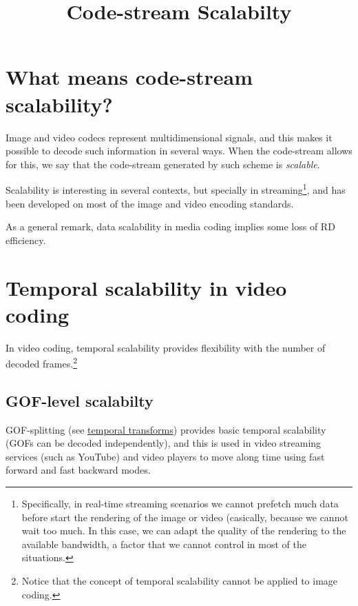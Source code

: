 



\title{Code-stream Scalabilty}

\maketitle
\tableofcontents

\section{What means code-stream scalability?}

Image and video codecs represent multidimensional signals, and this
makes it possible to decode such information in several ways. When the
code-stream allows for this, we say that the code-stream generated by such
scheme is \emph{scalable}.

Scalability is interesting in several contexts, but specially in
streaming\footnote{Specifically, in real-time streaming scenarios we
  cannot prefetch much data before start the rendering of the image or
  video (casically, because we cannot wait too much. In this case, we
  can adapt the quality of the rendering to the available bandwidth, a
  factor that we cannot control in most of the situations.}, and has
been developed on most of the image and video encoding standards.

As a general remark, data scalability in media coding implies some
loss of RD efficiency.


\section{Temporal scalability in video coding~\cite{vruiz__video_scalability}}


In video coding, temporal scalability provides flexibility with the
number of decoded frames.\footnote{Notice that the concept of temporal
scalability cannot be applied to image coding.}

\subsection{GOF-level scalabilty}
GOF-splitting (see
\href{https://sistemas-multimedia.github.io/contents/temporal_transforms/}{temporal
  transforms}) provides basic temporal scalability (GOFs can be
decoded independently), and this is used in video streaming services
(such as YouTube) and video players to move along time using fast
forward and fast backward modes.
  
